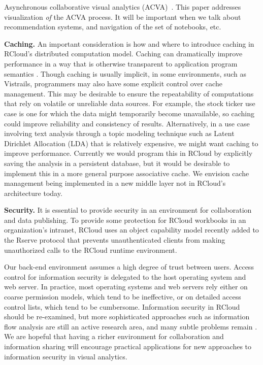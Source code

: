 Asynchronous collaborative visual analytics
(ACVA)~\cite{Chen:2011:SEC}. This paper addresses visualization
\emph{of} the ACVA process. It will be important when we talk about
recommendation systems, and navigation of the set of notebooks, etc.

{\bf Caching.}
An important consideration is how and where to introduce caching
in RCloud's distributed computation model. Caching can dramatically
improve performance in a way that is otherwise transparent to
application program semantics \cite{Callahan:2006:VVM, Guo:2010:TPI}.
Though caching is usually implicit, in some environments, such as
Vistrails, programmers may also have some explicit control over cache
management. This may be desirable to ensure the repeatability of
computations that rely on volatile or unreliable data sources.
For example, the stock ticker use case is one for which the data
might temporarily become unavailable, so caching could improve
reliability and consistency of results.  Alternatively, in a use case
involving text analysis through a topic modeling technique such as
Latent Dirichlet Allocation (LDA) that is relatively expensive,
we might want caching to improve performance. Currently we would
program this in RCloud by explicitly saving the analysis in a
persistent database, but it would be desirable to implement this
in a more general purpose associative cache. We envision cache
management being implemented in a new middle layer not in RCloud's
architecture today.

{\bf Security.}
It is essential to provide security in an environment for
collaboration and data publishing. To provide some
protection for RCloud workbooks in an organization's intranet,
RCloud uses an object capability model
\cite{Miller:2006:RCT}
recently added to the Rserve protocol \cite{Urbanek:2003:AFW}
that prevents unauthenticated clients from making
unauthorized calls to the RCloud runtime environment.

Our back-end environment assumes a high degree of trust between users.
Access control for information security is delegated to the host
operating system and web server. In practice, most operating
systems and web servers rely either on coarse permission models,
which tend to be ineffective, or on detailed access control
lists, which tend to be cumbersome. 
Information security in RCloud should be re-examined, but more
sophisticated approaches such as information flow analysis are
still an active research area, and many subtle problems remain
\cite{Moore:2011:SAF}. We are hopeful that having a richer
environment for collaboration and information sharing will encourage
practical applications for new approaches to information security
in visual analytics.
